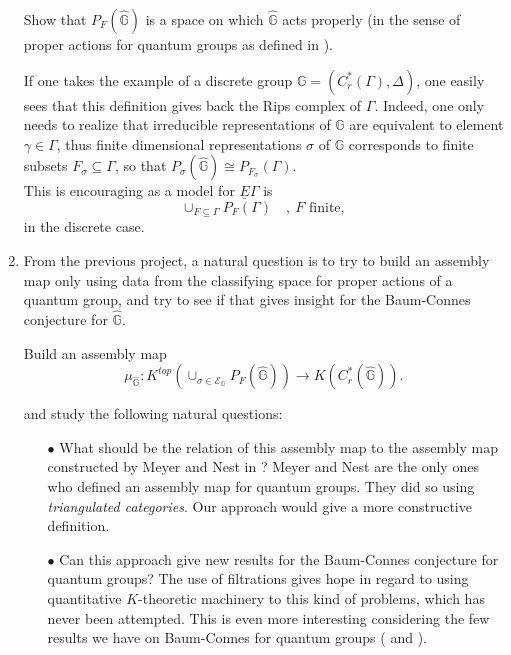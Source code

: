 \begin{enumerate}
\begin{project} Show that $P_F(\hat{\mathbb G})$ is a space on which $\hat{\mathbb G}$ acts properly (in the sense of proper actions for quantum groups as defined in \cite{Ellwood}).
\end{project}

If one takes the example of a discrete group $\mathbb G = (C^*_r(\Gamma),\Delta)$, one easily sees that this definition gives back the Rips complex of $\Gamma$. Indeed, one only needs to realize that irreducible representations of $\mathbb G$ are equivalent to element $\gamma \in \Gamma$, thus finite dimensional representations $\sigma$ of $\mathbb G$ corresponds to finite subsets $F_\sigma \subseteq \Gamma$, so that $P_\sigma(\hat{\mathbb G}) \cong P_{F_\sigma}(\Gamma)$.\\

This is encouraging as a model for $\underline E \Gamma$ is \[\cup_{F\subseteq \Gamma} P_F(\Gamma)\quad ,\ F \text{ finite},\] in the discrete case.
  
\item From the previous project, a natural question is to try to build an assembly map only using data from the classifying space for proper actions of a quantum group, and try to see if that gives insight for the Baum-Connes conjecture for $\hat{\mathbb G}$.\\

\begin{project} Build an assembly map 
\[\mu_{\hat{\mathbb G}} : K^{top}(\cup_{\sigma\in \mathcal E_{\mathbb G}}P_F(\hat{\mathbb G}))\rightarrow K(C^*_r(\hat{\mathbb G})).\]

and study the following natural questions: 
\begin{itemize}
\item[$\bullet$] What should be the relation of this assembly map to the assembly map constructed by Meyer and Nest in \cite{MeyerNest}? Meyer and Nest are the only ones who defined an assembly map for quantum groups. They did so using \textit{triangulated categories}. Our approach would give a more constructive definition. 
\item[$\bullet$] Can this approach give new results for the Baum-Connes conjecture for quantum groups? The use of filtrations gives hope in regard to using quantitative $K$-theoretic machinery to this kind of problems, which has never been attempted. This is even more interesting considering the few results we have on Baum-Connes for quantum groups (\cite{Voigt1} and \cite{Voigt2}).
\end{itemize}
\end{project}


\end{enumerate}
